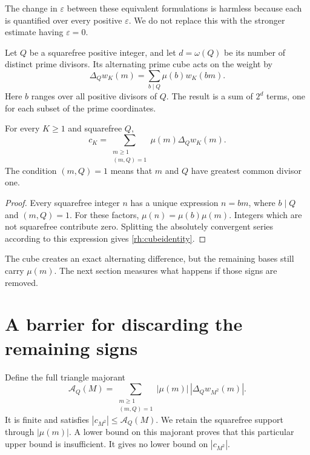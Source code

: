 The change in \(\varepsilon\) between these equivalent formulations is harmless because each is quantified over every positive \(\varepsilon\). We do not replace this with the stronger estimate having \(\varepsilon=0\).

Let \(Q\) be a squarefree positive integer, and let \(d=\omega(Q)\) be its number of distinct prime divisors. Its alternating prime cube acts on the weight by
\begin{equation}\label{rh:deltaq}
\Delta_Qw_K(m)=\sum_{b\mid Q}\mu(b)w_K(bm).
\end{equation}
Here \(b\) ranges over all positive divisors of \(Q\). The result is a sum of \(2^d\) terms, one for each subset of the prime coordinates.

\begin{proposition}\label{rh:cube}
For every \(K\ge1\) and squarefree \(Q\),
\begin{equation}\label{rh:cubeidentity}
c_K=\sum_{\substack{m\ge1\\(m,Q)=1}}
\mu(m)\Delta_Qw_K(m).
\end{equation}
The condition \((m,Q)=1\) means that \(m\) and \(Q\) have greatest common divisor one.
\end{proposition}

\begin{proof}
Every squarefree integer \(n\) has a unique expression \(n=bm\), where \(b\mid Q\) and \((m,Q)=1\). For these factors, \(\mu(n)=\mu(b)\mu(m)\). Integers which are not squarefree contribute zero. Splitting the absolutely convergent series according to this expression gives \eqref{rh:cubeidentity}.
\end{proof}

The cube creates an exact alternating difference, but the remaining bases still carry \(\mu(m)\). The next section measures what happens if those signs are removed.

\section{A barrier for discarding the remaining signs}

Define the full triangle majorant
\begin{equation}\label{rh:majorant}
\mathcal A_Q(M)=\sum_{\substack{m\ge1\\(m,Q)=1}}
|\mu(m)|\,|\Delta_Qw_{M^2}(m)|.
\end{equation}
It is finite and satisfies \(|c_{M^2}|\le\mathcal A_Q(M)\). We retain the squarefree support through \(|\mu(m)|\). A lower bound on this majorant proves that this particular upper bound is insufficient. It gives no lower bound on \(|c_{M^2}|\).

